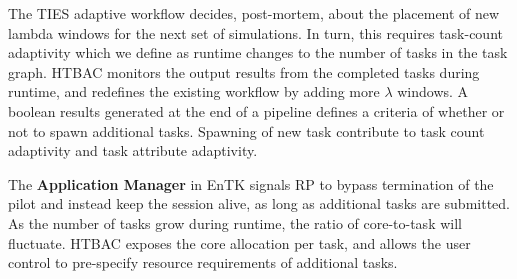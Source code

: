 The TIES adaptive workflow decides, post-mortem, about the placement
of new lambda windows for the next set of simulations. In turn, this requires 
task-count adaptivity which we define as runtime changes to the number of tasks 
in the task graph. HTBAC monitors the output results from the completed tasks
during runtime, and redefines the existing workflow by adding more $\lambda$
windows. A boolean results generated at the end of a pipeline defines a criteria
of whether or not to spawn additional tasks. Spawning of new task contribute
to task count adaptivity and task attribute adaptivity. 

The \textbf{Application
Manager} in EnTK signals RP to bypass termination of the pilot and instead
keep the session alive, as long as additional tasks are submitted. As the
number of tasks grow during runtime, the ratio of core-to-task will fluctuate.
HTBAC exposes the core allocation per task, and allows the user control to
pre-specify resource requirements of additional tasks.







